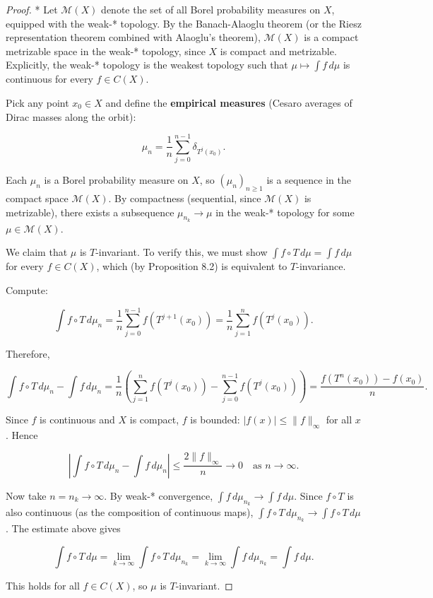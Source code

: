 \begin{proof}
* Let $\mathcal{M}(X)$ denote the set of all Borel probability measures on $X$, equipped with the weak-* topology. By the Banach-Alaoglu theorem (or the Riesz representation theorem combined with Alaoglu's theorem), $\mathcal{M}(X)$ is a compact metrizable space in the weak-* topology, since $X$ is compact and metrizable. Explicitly, the weak-* topology is the weakest topology such that $\mu \mapsto \int f \, d\mu$ is continuous for every $f \in C(X)$.

Pick any point $x_0 \in X$ and define the \textbf{empirical measures} (Cesaro averages of Dirac masses along the orbit):

\[
\mu_n = \frac{1}{n} \sum_{j=0}^{n-1} \delta_{T^j(x_0)}.
\]

Each $\mu_n$ is a Borel probability measure on $X$, so $(\mu_n)_{n \ge 1}$ is a sequence in the compact space $\mathcal{M}(X)$. By compactness (sequential, since $\mathcal{M}(X)$ is metrizable), there exists a subsequence $\mu_{n_k} \to \mu$ in the weak-* topology for some $\mu \in \mathcal{M}(X)$.

We claim that $\mu$ is $T$-invariant. To verify this, we must show $\int f \circ T \, d\mu = \int f \, d\mu$ for every $f \in C(X)$, which (by Proposition 8.2) is equivalent to $T$-invariance.

Compute:

\[
\int f \circ T \, d\mu_n = \frac{1}{n} \sum_{j=0}^{n-1} f(T^{j+1}(x_0)) = \frac{1}{n} \sum_{j=1}^{n} f(T^j(x_0)).
\]

Therefore,

\[
\int f \circ T \, d\mu_n - \int f \, d\mu_n = \frac{1}{n}\left(\sum_{j=1}^{n} f(T^j(x_0)) - \sum_{j=0}^{n-1} f(T^j(x_0))\right) = \frac{f(T^n(x_0)) - f(x_0)}{n}.
\]

Since $f$ is continuous and $X$ is compact, $f$ is bounded: $|f(x)| \le \|f\|_\infty$ for all $x$. Hence

\[
\left|\int f \circ T \, d\mu_n - \int f \, d\mu_n\right| \le \frac{2\|f\|_\infty}{n} \to 0 \quad \text{as } n \to \infty.
\]

Now take $n = n_k \to \infty$. By weak-* convergence, $\int f \, d\mu_{n_k} \to \int f \, d\mu$. Since $f \circ T$ is also continuous (as the composition of continuous maps), $\int f \circ T \, d\mu_{n_k} \to \int f \circ T \, d\mu$. The estimate above gives

\[
\int f \circ T \, d\mu = \lim_{k \to \infty} \int f \circ T \, d\mu_{n_k} = \lim_{k \to \infty} \int f \, d\mu_{n_k} = \int f \, d\mu.
\]

This holds for all $f \in C(X)$, so $\mu$ is $T$-invariant.
\end{proof}



